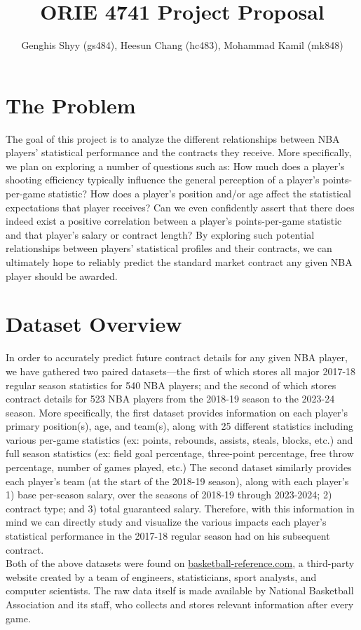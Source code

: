 \documentclass{article}
\title{ORIE 4741 Project Proposal}
\author{Genghis Shyy (gs484), Heesun Chang (hc483), Mohammad Kamil (mk848)}
\begin{document}
\maketitle

\section*{The Problem}
The goal of this project is to analyze the different relationships between NBA players' statistical performance and the contracts they receive. More specifically, we plan on exploring a number of questions such as: How much does a player's shooting efficiency typically influence the general perception of a player's points-per-game statistic? How does a player's position and/or age affect the statistical expectations that player receives? Can we even confidently assert that there does indeed exist a positive correlation between a player's points-per-game statistic and that player's salary or contract length? By exploring such potential relationships between players' statistical profiles and their contracts, we can ultimately hope to reliably predict the standard market contract any given NBA player should be awarded.


\section*{Dataset Overview}
In order to accurately predict future contract details for any given NBA player, we have gathered two paired datasets—the first of which stores all major 2017-18 regular season statistics for 540 NBA players; and the second of which stores contract details for 523 NBA players from the 2018-19 season to the 2023-24 season. More specifically, the first dataset provides information on each player's primary position(s), age, and team(s), along with 25 different statistics including various per-game statistics (ex: points, rebounds, assists, steals, blocks, etc.) and full season statistics (ex: field goal percentage, three-point percentage, free throw percentage, number of games played, etc.) The second dataset similarly provides each player's team (at the start of the 2018-19 season), along with each player's 1) base per-season salary, over the seasons of 2018-19 through 2023-2024; 2) contract type; and 3) total guaranteed salary. Therefore, with this information in mind we can directly study and visualize the various impacts each player's statistical performance in the 2017-18 regular season had on his subsequent contract.\\
Both of the above datasets were found on \url{basketball-reference.com}, a third-party website created by a team of engineers, statisticians, sport analysts, and computer scientists. The raw data itself is made available by National Basketball Association and its staff, who collects and stores relevant information after every game.
\end{document}
